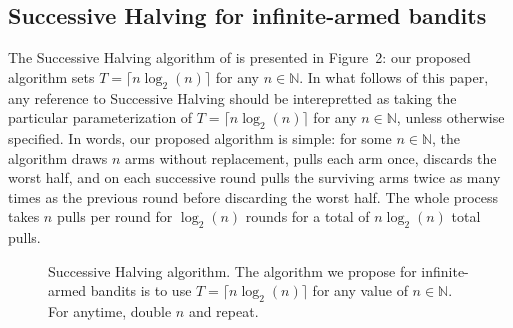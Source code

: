 




\subsection{Successive Halving for infinite-armed bandits}\label{theory}
The Successive Halving algorithm of \cite{icml2013_karnin13} is presented in Figure~2: our proposed algorithm sets $T=\lceil n\log_2(n)\rceil$ for any $n \in \mathbb{N}$.
In what follows of this paper, any reference to Successive Halving should be interepretted as taking the particular parameterization of $T=\lceil n \log_2(n) \rceil$ for any $n \in \mathbb{N}$, unless otherwise specified.
In words, our proposed algorithm is simple: for some $n \in \mathbb{N}$, the algorithm draws $n$ arms without replacement, pulls each arm once, discards the worst half, and on each successive round pulls the surviving arms twice as many times as the previous round before discarding the worst half. The whole process takes $n$ pulls per round for $\log_2(n)$ rounds for a total of $n \log_2(n)$ total pulls.

\begin{figure}[h]
\centering
{}
\caption{Successive Halving algorithm. The algorithm we propose for infinite-armed bandits is to use $T = \lceil n \log_2(n) \rceil$ for any value of $n \in \mathbb{N}$. For anytime, double $n$ and repeat.}\label{alg-SH}
\end{figure}

